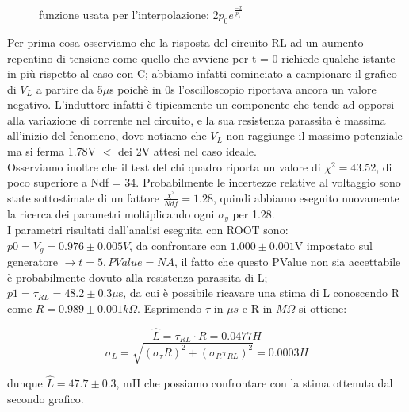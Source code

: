 \documentclass[a4paper]{article}
\theoremstyle{definition}
\begin{document}
\begin{figure}[!ht]

	\caption{funzione usata per l'interpolazione:  \(2p_{0}e^{\frac{-x}{p_{1}}}\) }

    \label{fig:RL_su_L}

\end{figure}
\noindent Per prima cosa osserviamo che la risposta del circuito RL ad un aumento repentino di tensione come quello che avviene per t = 0 richiede qualche istante in più rispetto al caso con C; abbiamo infatti cominciato a campionare il grafico di \(V_{L}\) a partire da 5\(\mu\)s poichè in 0s l'oscilloscopio riportava ancora un valore negativo. L'induttore infatti è tipicamente un componente che tende ad opporsi alla variazione di corrente nel circuito, e la sua resistenza parassita è massima all'inizio del fenomeno, dove notiamo che \(V_{L}\) non raggiunge il massimo potenziale ma si ferma 1.78V \(<\) dei 2V attesi nel caso ideale. \\

\noindent Osserviamo inoltre che il test del chi quadro riporta un valore di \(\chi^{2} = 43.52\), di poco superiore a Ndf = 34. Probabilmente le incertezze relative al voltaggio sono state sottostimate di un fattore \(\frac{\chi^{2}}{Ndf} = 1.28\), quindi abbiamo eseguito nuovamente la ricerca dei parametri moltiplicando ogni \(\sigma_{y}\) per 1.28. \\

\noindent I parametri risultati dall'analisi eseguita con ROOT sono:\\

\(  p0 = V_{g} = 0.976 \pm   0.005 V  \), da confrontare con \(1.000\pm 0.001\)V impostato sul generatore \(\rightarrow t = 5, PValue = NA\), il fatto che questo PValue non sia accettabile è probabilmente dovuto alla resistenza parassita di L; \\

\(  p1 = \tau_{RL}= 48.2 \pm 0.3  \mu\)s, da cui è possibile ricavare una stima di L conoscendo R come \(R = 0.989\pm 0.001 k\Omega\). Esprimendo \(\tau\) in \(\mu s\) e R in \(M \Omega\) si ottiene:

\[\hat{L} = \tau_{RL}\cdot R = 0.0477 H \] \[\sigma_{L}= \sqrt{(\sigma_{\tau} R)^{2} + (\sigma_{R}\tau_{RL})^{2}} = 0.0003 H\] 

\noindent dunque \(\hat{L} = 47.7 \pm 0.3 \), mH che possiamo confrontare con la stima ottenuta dal secondo grafico.\\
\end{document}
